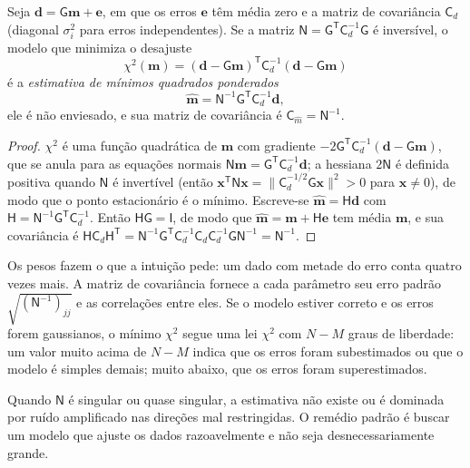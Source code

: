 \begin{theorem}\label{thm:b3:seismology-imaging:wls}
Seja $\mathbf d = \mathsf G\mathbf m + \mathbf e$, em que os erros $\mathbf e$
têm média zero e a matriz de covariância $\mathsf C_d$ (diagonal
$\sigma_i^2$ para erros independentes). Se a matriz
$\mathsf N = \mathsf G^{\mathsf T}\mathsf C_d^{-1}\mathsf G$ é inversível, o
modelo que minimiza o desajuste
\[
  \chi^2(\mathbf m) = (\mathbf d - \mathsf G\mathbf m)^{\mathsf T}\mathsf C_d^{-1}
  (\mathbf d - \mathsf G\mathbf m)
\]
é a \emph{estimativa de mínimos quadrados ponderados}
\[
  \hat{\mathbf m} = \mathsf N^{-1}\mathsf G^{\mathsf T}\mathsf C_d^{-1}\mathbf d ,
\]
ele é não enviesado, e sua matriz de covariância é
$\mathsf C_{\hat m} = \mathsf N^{-1}$.
\end{theorem}

\begin{proof}
$\chi^2$ é uma função quadrática de $\mathbf m$ com gradiente
$-2\mathsf G^{\mathsf T}\mathsf C_d^{-1}(\mathbf d - \mathsf G\mathbf m)$, que
se anula para as equações normais $\mathsf N\mathbf m = \mathsf G^{\mathsf T}
\mathsf C_d^{-1}\mathbf d$; a hessiana $2\mathsf N$ é definida positiva quando
$\mathsf N$ é invertível (então $\mathbf x^{\mathsf T}\mathsf N\mathbf x =
\|\mathsf C_d^{-1/2}\mathsf G\mathbf x\|^2 > 0$ para $\mathbf x \ne 0$), de modo que o
ponto estacionário é o mínimo. Escreve-se $\hat{\mathbf m} = \mathsf H\mathbf d$ com
$\mathsf H = \mathsf N^{-1}\mathsf G^{\mathsf T}\mathsf C_d^{-1}$. Então
$\mathsf H\mathsf G = \mathsf I$, de modo que $\hat{\mathbf m} = \mathbf m + \mathsf H\mathbf e$
tem média $\mathbf m$, e sua covariância é
$\mathsf H\mathsf C_d\mathsf H^{\mathsf T} =
\mathsf N^{-1}\mathsf G^{\mathsf T}\mathsf C_d^{-1}\mathsf C_d\mathsf C_d^{-1}
\mathsf G\mathsf N^{-1} = \mathsf N^{-1}$.
\end{proof}

Os pesos fazem o que a intuição pede: um dado com metade do erro conta
quatro vezes mais. A matriz de covariância fornece a cada parâmetro seu erro padrão
$\sqrt{(\mathsf N^{-1})_{jj}}$ e as correlações entre eles. Se o modelo
estiver correto e os erros forem gaussianos, o mínimo $\chi^2$ segue uma lei $\chi^2$
com $N - M$ graus de liberdade: um valor muito acima de $N - M$ indica que os erros
foram subestimados ou que o modelo é simples demais; muito abaixo, que os erros
foram superestimados.

Quando $\mathsf N$ é singular ou quase singular, a estimativa não existe ou é
dominada por ruído amplificado nas direções mal restringidas. O remédio
padrão é buscar um modelo que ajuste os dados razoavelmente e não seja
desnecessariamente grande.

